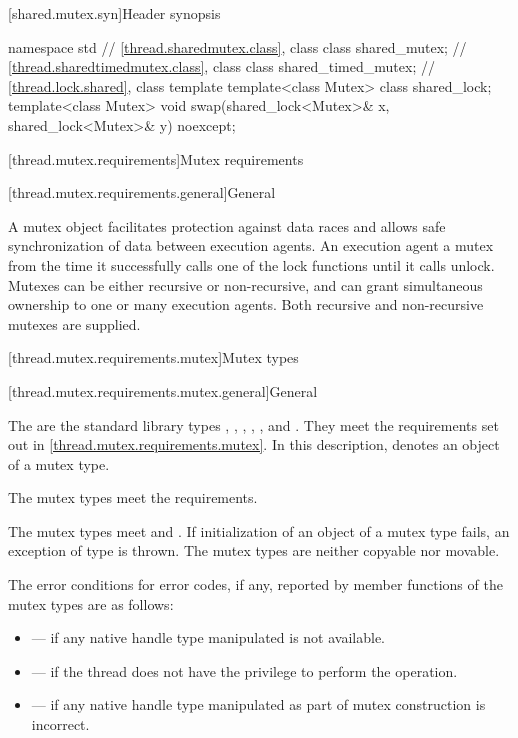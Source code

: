 [shared.mutex.syn]{Header  synopsis}

%
\begin{codeblock}
namespace std {
  // \ref{thread.sharedmutex.class}, class 
  class shared_mutex;
  // \ref{thread.sharedtimedmutex.class}, class 
  class shared_timed_mutex;
  // \ref{thread.lock.shared}, class template 
  template<class Mutex> class shared_lock;
  template<class Mutex>
    void swap(shared_lock<Mutex>& x, shared_lock<Mutex>& y) noexcept;
}
\end{codeblock}

[thread.mutex.requirements]{Mutex requirements}

[thread.mutex.requirements.general]{General}

\pnum
A mutex object facilitates protection against data races and allows safe synchronization of
data between execution agents.
An execution agent  a mutex from the time it successfully calls one of the
lock functions until it calls unlock. Mutexes can be either recursive or non-recursive, and can
grant simultaneous ownership to one or many execution agents. Both
recursive and non-recursive mutexes are supplied.

[thread.mutex.requirements.mutex]{Mutex types}

[thread.mutex.requirements.mutex.general]{General}

\pnum
The  are the standard library types ,
, , ,
, and .
They meet the requirements set out in \ref{thread.mutex.requirements.mutex}.
In this description,  denotes an object of a mutex type.
\begin{note}
The mutex types meet the  requirements.
\end{note}

\pnum
The mutex types meet  and .
If initialization of an object of a mutex type fails,
an exception of type  is thrown.
The mutex types are neither copyable nor movable.

\pnum
The error conditions for error codes, if any, reported by member functions of the mutex types
are as follows:
\begin{itemize}
\item {} --- if any native handle type manipulated is not available.
\item {} --- if the thread does not have the
privilege to perform the operation.
\item {} --- if any native handle type manipulated as part of mutex
construction is incorrect.
\end{itemize}

